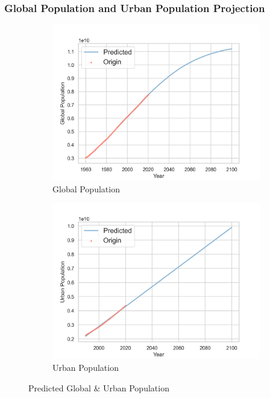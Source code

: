 \documentclass[12pt]{article}
\begin{document}
\subsubsection*{Global Population and Urban Population Projection}

\begin{figure}[hbt]
\centering
    \begin{subfigure}[]{0.4\textwidth}
        \includegraphics[width = \textwidth]{fig/projection/Global_Population.png}
        \caption{Global Population}
    \end{subfigure}
    \begin{subfigure}[]{0.4\textwidth}
        \includegraphics[width = \textwidth]{fig/projection/Urban_Population.png}
        \caption{Urban Population}
    \end{subfigure}
\caption{Predicted Global \& Urban Population}
\end{figure}
\end{document}
